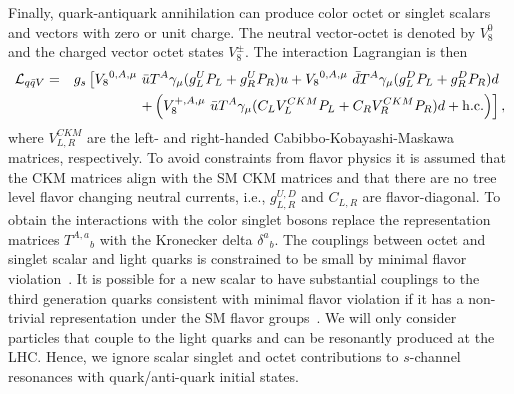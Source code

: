 Finally, quark-antiquark annihilation can produce color octet or singlet scalars and vectors with zero or unit charge.  The neutral vector-octet is denoted by $V^0_8$ and the  charged vector octet states $V^\pm_8$.  The interaction Lagrangian is then
\begin{eqnarray}
\mathcal{L}_{q\bar{q}V}&=&g_s\left[ {V_8}^{0,A,\mu}\ \bar{u} T^A \gamma_\mu (g^U_L P_L+g^U_{R}P_R)u+
{V_8}^{0,A,\mu}\ \bar{d} T^A \gamma_\mu (g^D_L P_L+g^D_{R}P_R)d \right .\nonumber\ \\
&&\left .+\left(V_8^{+,A,\mu}\ \bar{u} T^A \gamma_\mu (C_L V^{CKM}_LP_L+C_R V^{CKM}_R P_{R})d+\rm{h.c.}\right)\right ] ,
\label{eq:qqV}
\end{eqnarray}
where $V^{CKM}_{L,R}$ are the left- and right-handed Cabibbo-Kobayashi-Maskawa matrices, respectively.  To avoid constraints from flavor physics it is assumed that the CKM matrices align with the SM CKM matrices and that there are no tree level flavor changing neutral currents, i.e., $g^{U,D}_{L,R}$ and $C_{L,R}$ are flavor-diagonal.  To obtain the interactions with the color singlet bosons replace the representation matrices ${T^{A,a}}_b$ with the Kronecker delta ${\delta^a}_b$.  The couplings between octet and singlet scalar and light quarks is constrained to be small by minimal flavor violation~\cite{Manohar:2006ga}.  It is possible for a new scalar to have substantial couplings to the third generation quarks consistent with minimal flavor violation if it has a non-trivial representation under the SM flavor groups~\cite{Arnold:2009ay}.  We will only consider particles that couple to the light quarks and can be resonantly produced at the LHC.  Hence, we ignore scalar singlet and octet contributions to $s$-channel resonances with quark/anti-quark initial states.


